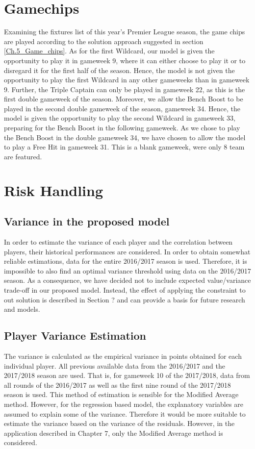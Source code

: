 \section{Gamechips} \label{exp_setup_gamechips}
Examining the fixtures list of this year's Premier League season, the game chips are played according to the solution approach suggested in section \ref{Ch.5_Game_chips}. As for the first Wildcard, our model is given the opportunity to play it in gameweek 9, where it can either choose to play it or to disregard it for the first half of the season. Hence, the model is not given the opportunity to play the first Wildcard in any other gameweeks than in gameweek 9. Further, the Triple Captain can only be played in gameweek 22, as this is the first double gameweek of the season. Moreover, we allow the Bench Boost to be played in the second double gameweek of the season, gameweek 34. Hence, the model is given the opportunity to play the second Wildcard in gameweek 33, preparing for the Bench Boost in the following gameweek. As we chose to play the Bench Boost in the double gameweek 34, we have chosen to allow the model to play a Free Hit in gameweek 31. This is a blank gameweek, were only 8 team are featured.


\section{Risk Handling}
\label{exp_setup_Value_Variance}

\subsection{Variance in the proposed model}

In order to estimate the variance of each player and the correlation between players, their historical performances are considered. In order to obtain somewhat reliable estimations, data for the entire 2016/2017 season is used. Therefore, it is impossible to also find an optimal variance threshold using data on the 2016/2017 season. As a consequence, we have decided not to include expected value/variance trade-off in our proposed model. Instead, the effect of applying the constraint to out solution is described in Section ? and can provide a basis for future research and models.

\subsection{Player Variance Estimation}
The variance is calculated as the empirical variance in points obtained for each individual player. All previous available data from the 2016/2017 and the 2017/2018 season are used. That is, for gameweek 10 of the 2017/2018, data from all rounds of the 2016/2017 as well as the first nine round of the 2017/2018 season is used. This method of estimation is sensible for the Modified Average method. However, for the regression based model, the explanatory variables are assumed to explain some of the variance. Therefore it would be more suitable to estimate the variance based on the variance of the residuals. However, in the application described in Chapter 7, only the Modified Average method is considered. \newpar

